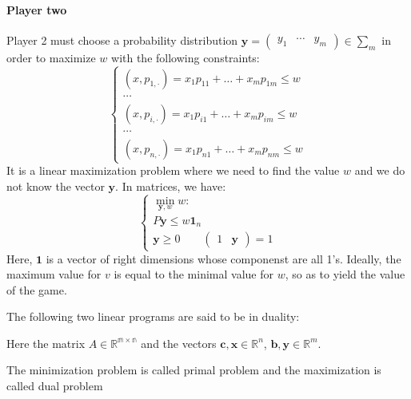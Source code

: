 \paragraph*{Player two}
Player 2 must choose a probability distribution $\mathbf{y}=\begin{pmatrix} y_1 & \cdots & y_m \end{pmatrix} \in \sum_m$ in order to maximize $w$ with the following constraints: 
\[\begin{cases}
    (x,p_{1,\cdot})=x_1p_{11}+\dots+x_mp_{1m}\leq w \\
    \cdots \\
    (x,p_{i,\cdot})=x_1p_{i1}+\dots+x_mp_{im}\leq w \\
    \cdots \\
    (x,p_{n,\cdot})=x_1p_{n1}+\dots+x_mp_{nm}\leq w 
\end{cases}\]
It is a linear maximization problem where we need to find the value $w$ and we do not know the vector $\mathbf{y}$.
In matrices, we have: 
\[\begin{cases}
    \min_{\mathbf{y},w}w: \\
    P\mathbf{y} \leq w\mathbf{1}_{n} \\
    \mathbf{y}\geq 0 \qquad \begin{pmatrix} 1 & \mathbf{y} \end{pmatrix} = 1
\end{cases}\]
Here, $\mathbf{1}$ is a vector of right dimensions whose componenst are all 1's.
Ideally, the maximum value for $v$ is equal to the minimal value for $w$, so as to yield the value of the game.
\begin{definition}
    The following two linear programs are said to be in duality: 

    Here the matrix $A\in\mathbb{R^{m\times n}}$ and the vectors $\mathbf{c},\mathbf{x}\in\mathbb{R}^n$, $\mathbf{b},\mathbf{y}\in\mathbb{R}^m$.
\end{definition}
The minimization problem is called primal problem and the maximization is called dual problem